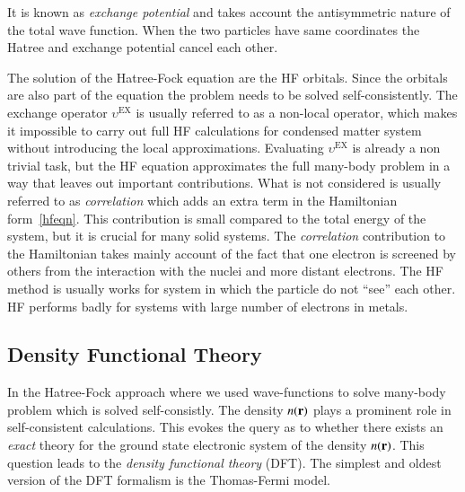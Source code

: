 
It is known as \textit{exchange potential} and takes account the antisymmetric nature of the total wave function. When the two particles have same coordinates the Hatree and exchange potential cancel each other.

The solution of the Hatree-Fock equation are the HF orbitals. Since the orbitals are also part of the equation the problem needs to be solved self-consistently. The exchange operator $\upsilon^{\text{EX}}$ is usually referred to as a non-local operator, which makes it impossible to carry out full HF calculations for condensed matter system without introducing the local approximations. Evaluating $\upsilon^{\text{EX}}$ is already a non trivial task, but the HF equation approximates the full many-body problem in a way that leaves out important contributions. What is not considered is usually referred to as \textit{correlation} which adds an extra term in the Hamiltonian form~\eqref{hfeqn}. This contribution is small compared to the total energy of the system, but it is crucial for many solid systems. The \textit{correlation} contribution to the Hamiltonian takes mainly account of the fact that one electron is screened by others from the interaction with the nuclei and more distant electrons. The HF method is usually works for system in which the particle do not ``see'' each other. HF performs badly for systems with large number of electrons in metals.




\subsection{Density Functional Theory}
In the Hatree-Fock approach where we used wave-functions to solve many-body problem which is solved self-consistly. The density $n(\vb{r})$ plays a prominent role in self-consistent calculations. This evokes the query as to whether there exists an \textit{exact} theory for the ground state electronic system of the density $n(\vb{r})$. This question leads to the \textit{density functional \mbox{theory}} (DFT). The simplest and oldest version of the DFT formalism is the Thomas-Fermi model\cite{thomas1927calculation,fermi1927metodo}.

